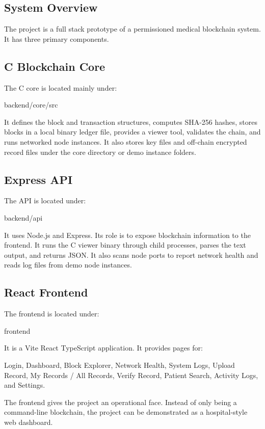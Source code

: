 \documentclass[12pt]{article}
\begin{document}
\subsection{System Overview}

The project is a full stack prototype of a permissioned medical blockchain system. It has three primary components.

\subsection{C Blockchain Core}

The C core is located mainly under:

backend/core/src

It defines the block and transaction structures, computes SHA-256 hashes, stores blocks in a local binary ledger file, provides a viewer tool, validates the chain, and runs networked node instances. It also stores key files and off-chain encrypted record files under the core directory or demo instance folders.

\subsection{Express API}

The API is located under:

backend/api

It uses Node.js and Express. Its role is to expose blockchain information to the frontend. It runs the C viewer binary through child processes, parses the text output, and returns JSON. It also scans node ports to report network health and reads log files from demo node instances.

\subsection{React Frontend}

The frontend is located under:

frontend

It is a Vite React TypeScript application. It provides pages for:

 Login, Dashboard, Block Explorer, Network Health, System Logs, Upload Record, My Records / All Records, Verify Record, Patient Search, Activity Logs, and Settings.

The frontend gives the project an operational face. Instead of only being a command-line blockchain, the project can be demonstrated as a hospital-style web dashboard.
\end{document}
